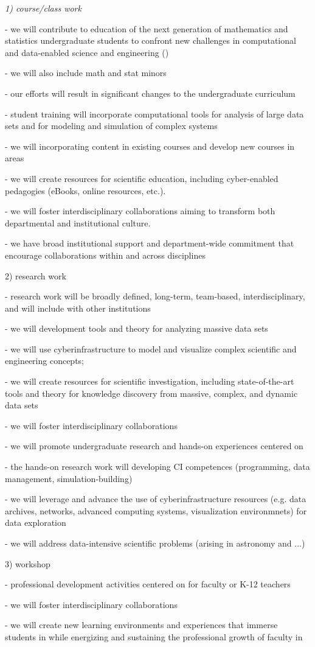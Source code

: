 {\it 
1) course/class work 

- we will contribute to education of the next generation of mathematics and statistics 
   undergraduate students to confront new challenges in computational and data-enabled 
   science and engineering (\cdse) 

- we will also include math and stat minors 

- our efforts will result in significant changes to the undergraduate curriculum

- student training will incorporate computational tools for analysis of large data sets and
   for modeling and simulation of complex systems

- we will incorporating \cdse content in existing courses and develop new courses in 
   \cdse areas

- we will create resources for scientific education, including cyber-enabled pedagogies 
   (eBooks, online resources, etc.).

- we will foster interdisciplinary collaborations aiming to transform both departmental and 
   institutional culture.

- we have broad institutional support and department-wide commitment that encourage 
   collaborations within and across disciplines


2) research work

- research work will be broadly defined, long-term, team-based, interdisciplinary, and 
   will include with other institutions 

- we will development tools and theory for analyzing massive data sets

- we will use cyberinfrastructure to model and visualize complex scientific and engineering 
   concepts;

- we will create resources for scientific investigation, including state-of-the-art tools and 
  theory for knowledge discovery from massive, complex, and dynamic data sets

- we will foster interdisciplinary collaborations

- we will promote undergraduate research and hands-on experiences centered on \cdse

- the hands-on research work will developing CI competences (programming, data 
   management, simulation-building)

- we will leverage and advance the use of cyberinfrastructure resources (e.g. data archives, 
   networks, advanced computing systems, visualization environmnets) for data exploration

- we will address data-intensive scientific problems (arising in astronomy and ...)

3) workshop

- professional development activities centered on \cdse for faculty or K-12 teachers

- we will foster interdisciplinary collaborations

- we will create new learning environments and experiences that immerse students in \cdse 
   while energizing and sustaining the professional growth of faculty in \cdse
}





 


